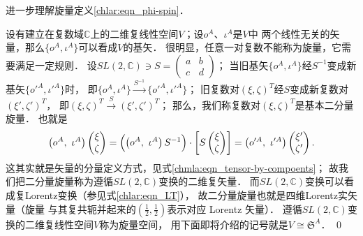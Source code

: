 
\begin{example}
    进一步理解旋量定义\eqref{chlar:eqn_phi-spin}．
\end{example}

设有建立在复数域$\mathbb{C}$上的二维复线性空间$V$；设$o^A$、$\iota^A$是$V$中
两个线性无关的矢量，那么$\{o^A,\iota^A\}$可以看成$V$的基矢．
很明显，任意一对复数不能称为旋量，它需要满足一定规则．
设$SL(2,\mathbb{C}) \ni S = \left(\begin{smallmatrix} a & b\\ c & d \end{smallmatrix}\right)$；
当旧基矢$\{o^A,\iota^A\}$经$S^{-1}$变成新基矢$\{o'^A,\iota'^A\}$时，
即$\{o^A,\iota^A\}\overset{S^{-1}}{\rightarrow}\{o'^A,\iota'^A\}$；
旧复数对$(\xi,\zeta)^T$经$S$变成新复数对$(\xi',\zeta')^T$，
即$(\xi,\zeta)^T \overset{S}{\rightarrow} (\xi',\zeta')^T$；
那么，我们称复数对$(\xi,\zeta)^T$是基本二分量旋量．
也就是
\begin{equation}
    \left(o^A,\ \iota^A\right) \begin{pmatrix} \xi \\\zeta \end{pmatrix}
    =\Bigl(\left(o^A,\ \iota^A\right) S^{-1}\Bigr) \cdot 
    \left[S \begin{pmatrix} \xi \\\zeta \end{pmatrix}\right]
    =\left(o'^A,\ \iota'^A\right) \begin{pmatrix} \xi' \\\zeta' \end{pmatrix} .
\end{equation}
这其实就是矢量的分量定义方式，见式\eqref{chmla:eqn_tensor-by-compoents}；
故我们把二分量旋量称为遵循$SL(2,\mathbb{C})$变换的二维复矢量．
而$SL(2,\mathbb{C})$变换可以看成复Lorentz变换（参见式\eqref{chlar:eqn_LT}），
故二分量旋量也就是四维Lorentz实矢量（旋量
与其复共轭并起来的$(\frac{1}{2},\frac{1}{2})$表示对应 Lorentz 矢量）．
遵循$SL(2,\mathbb{C})$变换的二维复线性空间$V$称为旋量空间，
用下面即将介绍的记号就是$V\cong \mathfrak{S}^A$． \qed


